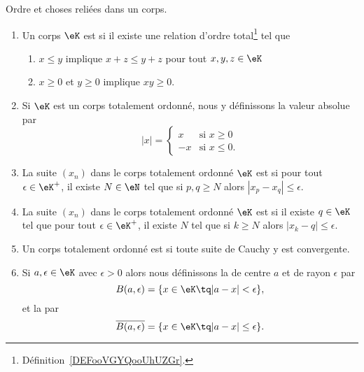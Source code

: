 \begin{definition}      \label{DefKCGBooLRNdJf}
	Ordre et choses reliées dans un corps.
	\begin{enumerate}
		\item \label{ITEMooOOOVooJWwIQr}
		      Un corps \( \eK\) est  si il existe une relation d'ordre total\footnote{Définition~\ref{DEFooVGYQooUhUZGr}.} tel que
		      \begin{enumerate}
			      \item       \label{ITEMooZISJooWNxnBj}
			            \( x\leq y\) implique \( x+z\leq y+z\) pour tout \( x,y,z\in \eK\)
			      \item   \label{CONDooBYYDooElXgPO}
			            \( x\geq 0\) et \( y\geq 0\) implique \( xy\geq 0\).
		      \end{enumerate}
		\item       \label{ItemooWUGSooRSRvYC}
		      Si \( \eK\) est un corps totalement ordonné, nous y définissons la valeur absolue par
		      \begin{equation}      \label{EQooNONAooHLSERO}
			      | x |=\begin{cases}
				      x  & \text{si }x\geq 0   \\
				      -x & \text{si } x\leq 0.
			      \end{cases}
		      \end{equation}
		\item       \label{ItemVXOZooTYpcYN}
		      La suite \( (x_n)\) dans le corps totalement ordonné \( \eK\) est  si pour tout \( \epsilon\in \eK^+\), il existe \( N\in \eN\) tel que si \( p,q\geq N\) alors \( | x_p-x_q |\leq \epsilon\).
		\item       \label{ITEMooDERQooLmJwFR}
		      La suite \( (x_n)\) dans le corps totalement ordonné \( \eK\) est  si il existe \( q\in \eK\) tel que pour tout \( \epsilon\in \eK^+\), il existe \( N\) tel que si \( k\geq N\) alors \( | x_k-q |\leq \epsilon\).

		\item       \label{ITEMooKZZYooDaidGU}
		      Un corps totalement ordonné est  si toute suite de Cauchy y est convergente.
		\item       \label{ITEMooMWASooEzhVyh}
		      Si \( a,\epsilon\in \eK\) avec \( \epsilon>0\) alors nous définissons la  de centre \( a\) et de rayon \( \epsilon\) par
		      \begin{equation}
			      B(a,\epsilon)=\{ x\in \eK\tq | a-x |<\epsilon \},
		      \end{equation}
		      et la  par
		      \begin{equation}
			      \overline{ B(a,\epsilon) }=\{ x\in \eK\tq | a-x |\leq \epsilon \}.
		      \end{equation}
	\end{enumerate}
\end{definition}

